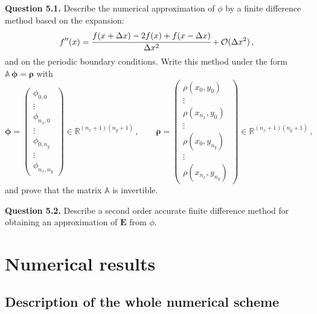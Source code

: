 \documentclass[10pt]{article}
\newcommand{\R}{{\mathbb R}}
\begin{document}
\begin{leftbar}
\textbf{Question 5.1.} Describe the numerical approximation of $\phi$ by a finite difference method based on the expansion:
\begin{equation}
f''(x) = \cfrac{f(x+\Delta x)-2f(x)+f(x-\Delta x)}{\Delta x^{2}} + \mathcal{O}(\Delta x^{2}) \, ,
\end{equation}
and on the periodic boundary conditions. Write this method under the form $\mathbb{A}\,\bm{\phi} = \bm{\rho}$ with
\begin{equation}
\bm{\phi} = \left(
\begin{array}{c}
\phi_{0,0} \\ \vdots \\ \phi_{n_{x},0} \\ \vdots \\ \phi_{0,n_{y}} \\ \vdots \\ \phi_{n_{x},n_{y}}
\end{array}
\right) \in \R^{(n_{x}+1)(n_{y}+1)} \, , \qquad \bm{\rho} = \left(
\begin{array}{c}
\rho(x_{0},y_{0}) \\ \vdots \\ \rho(x_{n_{x}},y_{0}) \\ \vdots \\ \rho(x_{0},y_{n_{y}}) \\ \vdots \\ \rho(x_{n_{x}},y_{n_{y}})
\end{array}
\right) \in \R^{(n_{x}+1)(n_{y}+1)} \, ,
\end{equation}
and prove that the matrix $\mathbb{A}$ is invertible.
\end{leftbar}


\begin{leftbar}
\textbf{Question 5.2.} Describe a second order accurate finite difference method for obtaining an approximation of $\mathbf{E}$ from $\phi$.
\end{leftbar}












\section{Numerical results}
\setcounter{equation}{0}


\subsection{Description of the whole numerical scheme}
\end{document}
